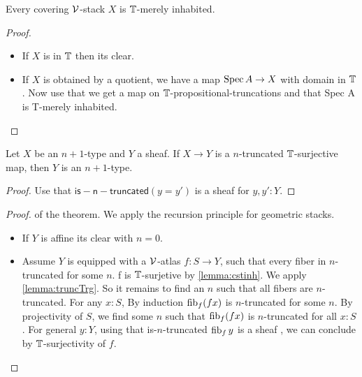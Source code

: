 \documentclass{article}
\begin{document}
\begin{lemma}{\label{lemma:cstinh}}
	Every covering $\mathcal{V}$-stack $X$ is $\mathbb{T}$-merely inhabited.

\end{lemma}
\begin{proof} 
	\begin{itemize}
		\item If $X$ is in $\mathbb{T}$ then its clear.
		\item  If $X$ is obtained by a quotient, we have a map $\operatorname{Spec} A \to X$ with domain in $\mathbb{T}$. Now use that we get a map on $\mathbb{T}$-propositional-truncations and that Spec A is T-merely inhabited.
		\end{itemize}
\end{proof}
\begin{lemma}{\label{lemma:truncTrg}}
	Let $X$ be an $n+1$-type and $Y$ a sheaf. If $X \to Y$ is a $n$-truncated $\mathbb{T}$-surjective map, then $Y$ is an $n+1$-type.
\end{lemma}
\begin{proof}
	Use that $\mathsf{is-n-truncated} (y=y')$ is a sheaf for $y , y' : Y.$
\end{proof}

\begin{proof} of the theorem.
	We apply the recursion principle for geometric stacks.
\begin{itemize}
	\item If $Y$ is affine its clear with $n = 0$.
	\item Assume $Y$ is equipped with a $\mathcal{V}$-atlas $f : S \to Y$, such that every fiber in $n$-truncated for some $n$. f is $\mathbb{T}$-surjetive by \ref{lemma:cstinh}.
	We apply \ref{lemma:truncTrg}.
	So it remains to find an $n$ such that all fibers are $n$-truncated.
	For any $x : S$, By induction $\operatorname{fib}_f (f x)$ is $n$-truncated for some $n$. By projectivity of $S$, we find some $n$ such that $\operatorname{fib}_f (f x)$ is $n$-truncated for all $x : S$. For general $y : Y$, using that is-$n$-truncated $\operatorname{fib}_f y$ is a sheaf , we can conclude by $\mathbb{T}$-surjectivity of $f$.
\end{itemize}

%

\end{proof}
\end{document}
